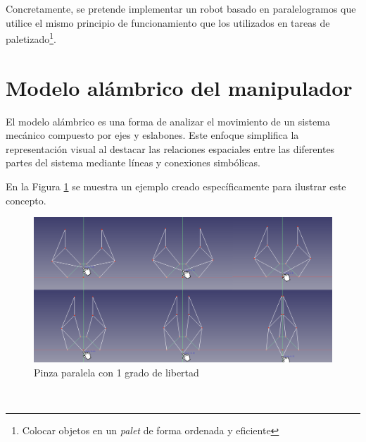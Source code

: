 Concretamente, se pretende implementar un robot basado en paralelogramos que utilice el mismo principio de funcionamiento que los utilizados en 
tareas de paletizado\footnote{Colocar objetos en un \textit{palet} de forma ordenada y eficiente}.

\section{Modelo alámbrico del manipulador}
\noindent El modelo alámbrico es una forma de analizar el movimiento de un sistema mecánico compuesto por ejes y eslabones. Este 
enfoque simplifica la representación visual al destacar las relaciones espaciales entre las diferentes partes del sistema mediante 
líneas y conexiones simbólicas.

En la Figura \ref{fig:mod_pinza_figure} se muestra un ejemplo creado específicamente para ilustrar este concepto.
\begin{figure} [ht!]
  \begin{center}
    \includegraphics[width=15cm]{figs/pinza_evol.png}
  \end{center}
  \caption{Pinza paralela con 1 grado de libertad}
  \label{fig:mod_pinza_figure}
\end{figure}\ 

